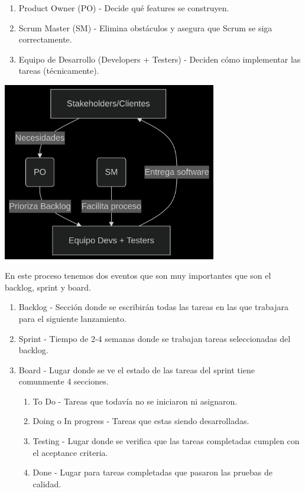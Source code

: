 \begin{enumerate}
  \item Product Owner (PO) - Decide qué features se construyen.
  \item  Scrum Master (SM) - Elimina obstáculos y asegura que Scrum se siga correctamente.
  \item Equipo de Desarrollo (Developers + Testers) - Deciden cómo implementar las tareas (técnicamente).
\end{enumerate}
\begin{center}
	\includegraphics[width=0.7\textwidth]{image/scrum_team.png}
\end{center}

En este proceso tenemos dos eventos que son muy importantes que son el backlog, sprint y board.
\begin{enumerate}
  \item Backlog - Sección donde se escribirán todas las tareas en las que trabajara para el siguiente lanzamiento.
  \item Sprint - Tiempo de 2-4 semanas donde se trabajan tareas seleccionadas del backlog.
  \item Board - Lugar donde se ve el estado de las tareas del sprint tiene comunmente 4 secciones.
    \begin{enumerate}
      \item To Do - Tareas que todavía no se iniciaron ni asignaron.
      \item Doing o In progress - Tareas que estas siendo desarrolladas.
      \item Testing - Lugar donde se verifica que las tareas completadas cumplen con el aceptance criteria.
      \item Done - Lugar para tareas completadas que pasaron las pruebas de calidad.
    \end{enumerate}
\end{enumerate}

